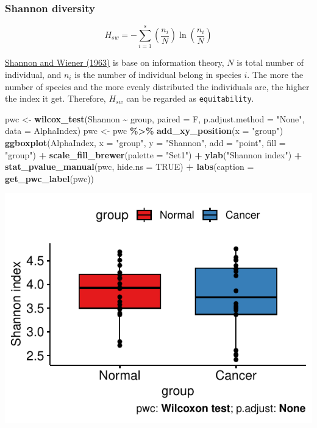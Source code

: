 \documentclass[
]{article}
\newenvironment{Shaded}{\begin{snugshade}}{\end{snugshade}}
\newcommand{\AttributeTok}[1]{\textcolor[rgb]{0.13,0.29,0.53}{#1}}
\newcommand{\ConstantTok}[1]{\textcolor[rgb]{0.56,0.35,0.01}{#1}}
\newcommand{\FunctionTok}[1]{\textcolor[rgb]{0.13,0.29,0.53}{\textbf{#1}}}
\newcommand{\NormalTok}[1]{#1}
\newcommand{\OtherTok}[1]{\textcolor[rgb]{0.56,0.35,0.01}{#1}}
\newcommand{\SpecialCharTok}[1]{\textcolor[rgb]{0.81,0.36,0.00}{\textbf{#1}}}
\newcommand{\StringTok}[1]{\textcolor[rgb]{0.31,0.60,0.02}{#1}}
\begin{document}
\hypertarget{shannon-diversity}{%
\subsubsection{Shannon diversity}\label{shannon-diversity}}

\[ H_{sw} = - \sum_{i = 1}^{s} (\frac{n_i}{N}) \ln(\frac{n_i}{N}) \]

\href{https://monoskop.org/images/b/be/Shannon_Claude_E_Weaver_Warren_The_Mathematical_Theory_of_Communication_1963.pdf}{Shannon
and Wiener (1963)} is base on information theory, \(N\) is total number
of individual, and \(n_i\) is the number of individual belong in species
\(i\). The more the number of species and the more evenly distributed
the individuals are, the higher the index it get. Therefore, \(H_{sw}\)
can be regarded as \texttt{equitability}.

\begin{Shaded}
\begin{Highlighting}[]
\NormalTok{pwc }\OtherTok{\textless{}{-}} \FunctionTok{wilcox\_test}\NormalTok{(Shannon }\SpecialCharTok{\textasciitilde{}}\NormalTok{ group, }\AttributeTok{paired =}\NormalTok{ F, }\AttributeTok{p.adjust.method =} \StringTok{"None"}\NormalTok{, }\AttributeTok{data =}\NormalTok{ AlphaIndex)}
\NormalTok{pwc }\OtherTok{\textless{}{-}}\NormalTok{ pwc }\SpecialCharTok{\%\textgreater{}\%} \FunctionTok{add\_xy\_position}\NormalTok{(}\AttributeTok{x =} \StringTok{"group"}\NormalTok{)}
\FunctionTok{ggboxplot}\NormalTok{(AlphaIndex, }\AttributeTok{x =} \StringTok{"group"}\NormalTok{, }\AttributeTok{y =} \StringTok{"Shannon"}\NormalTok{, }\AttributeTok{add =} \StringTok{"point"}\NormalTok{, }\AttributeTok{fill =} \StringTok{"group"}\NormalTok{) }\SpecialCharTok{+}
  \FunctionTok{scale\_fill\_brewer}\NormalTok{(}\AttributeTok{palette =} \StringTok{"Set1"}\NormalTok{) }\SpecialCharTok{+} \FunctionTok{ylab}\NormalTok{(}\StringTok{"Shannon index"}\NormalTok{) }\SpecialCharTok{+}
  \FunctionTok{stat\_pvalue\_manual}\NormalTok{(pwc, }\AttributeTok{hide.ns =} \ConstantTok{TRUE}\NormalTok{) }\SpecialCharTok{+}
  \FunctionTok{labs}\NormalTok{(}\AttributeTok{caption =} \FunctionTok{get\_pwc\_label}\NormalTok{(pwc))}
\end{Highlighting}
\end{Shaded}

\includegraphics[width=0.7\linewidth,height=0.7\textheight]{workshop_files/figure-latex/unnamed-chunk-16-1}
\end{document}
